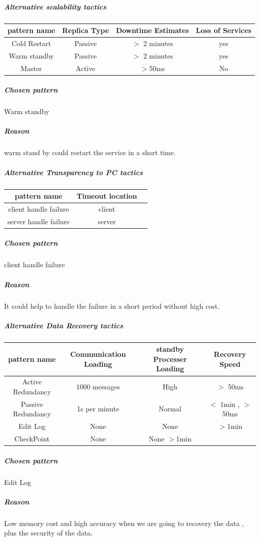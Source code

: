 \documentclass{article}
\begin{document}
			
			\subparagraph{Alternative scalability tactics}
					\begin{center}
						\begin{tabular}{|c|c|c|c|}
							\hline
							pattern name & Replica Type & Downtime Estimates & Loss of Services\\
							\hline
							Cold Restart & Passive 		& $>$ 2 minutes			  & yes			\\
							\hline
							Warm standby & Passive     &  $>$ 2 minutes			  & yes			\\
							\hline
							Master		 & Active		& $>$50ms & No\\
							\hline
						\end{tabular}
					\end{center}
					\subparagraph{Chosen pattern} 
					Warm standby
					\subparagraph{Reason} 
					warm stand by could restart the service in a short time.
			\subparagraph{Alternative Transparency to PC tactics}
					\begin{center}
						\begin{tabular}{|c|c|c|}
							\hline
							pattern name & Timeout location\\
							\hline
							client handle failure & client \\
							\hline
							server handle failure & server\\ 
							\hline
						\end{tabular}
					\end{center}
					\subparagraph{Chosen pattern} 
					client handle failure 
					\subparagraph{Reason} 
					It could help to handle the failure in a short period without high cost.
			\subparagraph{Alternative Data Recovery tactics}
					\begin{center}
						\begin{tabular}{|c|c|c|c|}
							\hline
							pattern name & Communication Loading & standby Processer Loading & Recovery Speed\\
							\hline
							Active Redundancy & 1000 messages & High & $>$ 50ms \\
							\hline
							Passive Redundancy & 1s per minute & Normal & $<$ 1min , $>$ 50ms \\
							\hline
							Edit Log 	& None & None & $>$1min\\
							\hline
							CheckPoint & None & None $> $1min\\
							\hline
						\end{tabular}
					\end{center}
					\subparagraph{Chosen pattern} 
					Edit Log
					\subparagraph{Reason} 
					Low memory cost and high accuracy when we are going to recovery the data , plus the security of the data.
					
\end{document}
